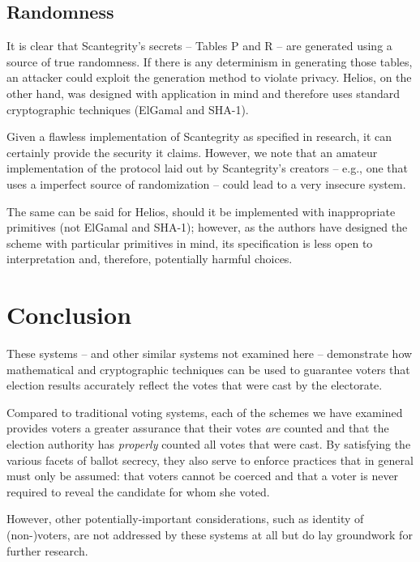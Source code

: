 \documentclass[10pt,twocolumn]{article}
\begin{document}
\subsection{Randomness}

It is clear that Scantegrity's secrets -- Tables P and R -- are generated using a source of true
randomness. If there is any determinism in generating those tables, an attacker could exploit the
generation method to violate privacy. Helios, on the other hand, was designed with application in
mind and therefore uses standard cryptographic techniques (ElGamal and SHA-1).

Given a flawless implementation of Scantegrity as specified in research, it can certainly provide the
security it claims. However, we note that an amateur implementation of the protocol laid out by
Scantegrity's creators -- e.g., one that uses a imperfect source of randomization -- could lead to a
very insecure system.

The same can be said for Helios, should it be implemented with inappropriate primitives (not ElGamal
and SHA-1); however, as the authors have designed the scheme with particular primitives in mind, its
specification is less open to interpretation and, therefore, potentially harmful choices.

\section{Conclusion}

These systems -- and other similar systems not examined here -- demonstrate how mathematical and
cryptographic techniques can be used to guarantee voters that election results accurately reflect
the votes that were cast by the electorate.

Compared to traditional voting systems, each of the schemes we have examined provides voters a
greater assurance that their votes \emph{are} counted and that the election authority has
\emph{properly} counted all votes that were cast. By satisfying the various facets of ballot
secrecy, they also serve to enforce practices that in general must only be assumed: that voters
cannot be coerced and that a voter is never required to reveal the candidate for whom she voted.

However, other potentially-important considerations, such as identity of (non-)voters, are not
addressed by these systems at all but do lay groundwork for further research.



\end{document}
